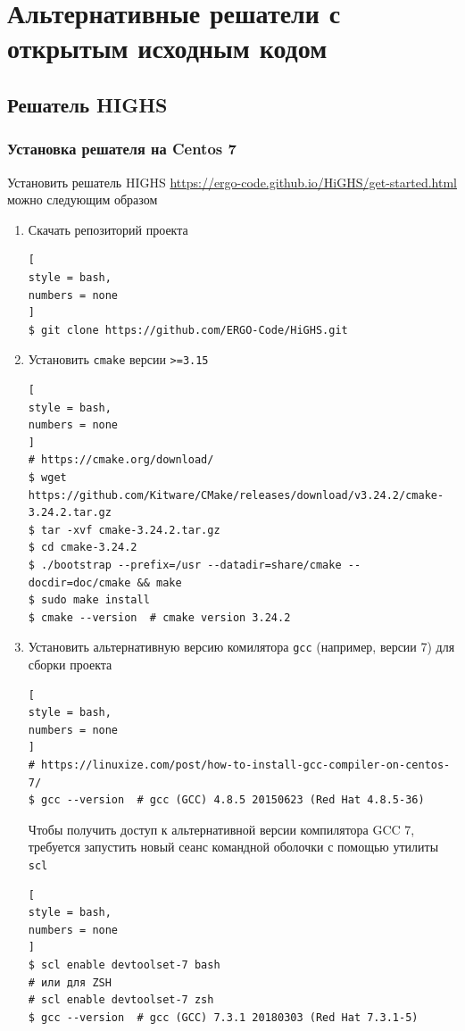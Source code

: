 \documentclass[%
	11pt,
	a4paper,
	utf8,
		]{article}
\begin{document}
\section{Альтернативные решатели с открытым исходным кодом}

\subsection{Решатель HIGHS}

\subsubsection{Установка решателя на Centos 7}

Установить решатель HIGHS \url{https://ergo-code.github.io/HiGHS/get-started.html} можно следующим образом
\begin{enumerate}
	\item Скачать репозиторий проекта
\begin{lstlisting}[
style = bash,
numbers = none
]
$ git clone https://github.com/ERGO-Code/HiGHS.git
\end{lstlisting}
    \item Установить \texttt{cmake} версии \texttt{>=3.15}
\begin{lstlisting}[
style = bash,
numbers = none
]
# https://cmake.org/download/
$ wget https://github.com/Kitware/CMake/releases/download/v3.24.2/cmake-3.24.2.tar.gz
$ tar -xvf cmake-3.24.2.tar.gz
$ cd cmake-3.24.2
$ ./bootstrap --prefix=/usr --datadir=share/cmake --docdir=doc/cmake && make
$ sudo make install
$ cmake --version  # cmake version 3.24.2
\end{lstlisting}
    \item Установить альтернативную версию комилятора \texttt{gcc} (например, версии 7) для сборки проекта
\begin{lstlisting}[
style = bash,
numbers = none	
]
# https://linuxize.com/post/how-to-install-gcc-compiler-on-centos-7/
$ gcc --version  # gcc (GCC) 4.8.5 20150623 (Red Hat 4.8.5-36)
\end{lstlisting}

Чтобы получить доступ к альтернативной версии компилятора GCC 7, требуется запустить новый сеанс командной оболочки с помощью утилиты \texttt{scl}
\begin{lstlisting}[
style = bash,
numbers = none
]
$ scl enable devtoolset-7 bash
# или для ZSH
# scl enable devtoolset-7 zsh
$ gcc --version  # gcc (GCC) 7.3.1 20180303 (Red Hat 7.3.1-5)
\end{lstlisting}


\end{enumerate}
\end{document}
